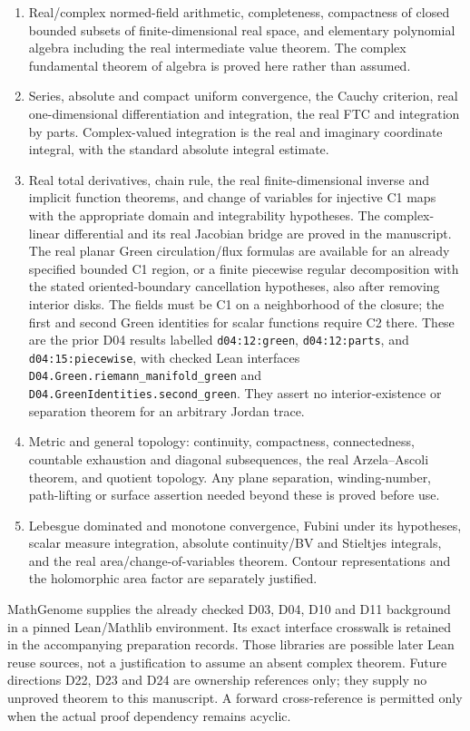 \documentclass[11pt,a4paper,openany]{book}
\theoremstyle{definition}
\theoremstyle{remark}\newtheorem{remark}[theorem]{Remark}
\begin{document}
\begin{enumerate}[label=F\arabic*.]
\item Real/complex normed-field arithmetic, completeness, compactness of closed
bounded subsets of finite-dimensional real space, and elementary polynomial
algebra including the real intermediate value theorem. The complex fundamental
theorem of algebra is proved here rather than assumed.
\item Series, absolute and compact uniform convergence, the Cauchy criterion,
real one-dimensional differentiation and integration, the real FTC and
integration by parts. Complex-valued integration is the real and imaginary
coordinate integral, with the standard absolute integral estimate.
\item Real total derivatives, chain rule, the real finite-dimensional inverse
and implicit function theorems, and change of variables for injective C1 maps
with the appropriate domain and integrability hypotheses. The complex-linear
differential and its real Jacobian bridge are proved in the manuscript.
The real planar Green circulation/flux formulas are available for an already
specified bounded C1 region, or a finite piecewise regular decomposition with
the stated oriented-boundary cancellation hypotheses, also after removing
interior disks. The fields must be C1 on a neighborhood of the closure;
the first and second Green identities for scalar functions require C2 there.
These are the prior D04 results labelled \texttt{d04:12:green},
\texttt{d04:12:parts}, and \texttt{d04:15:piecewise}, with checked Lean interfaces
\texttt{D04.Green.riemann\_manifold\_green} and
\texttt{D04.GreenIdentities.second\_green}. They assert no interior-existence
or separation theorem for an arbitrary Jordan trace.
\item Metric and general topology: continuity, compactness, connectedness,
countable exhaustion and diagonal subsequences, the real Arzela--Ascoli theorem,
and quotient topology. Any plane separation, winding-number, path-lifting or
surface assertion needed beyond these is proved before use.
\item Lebesgue dominated and monotone convergence, Fubini under its hypotheses,
scalar measure integration, absolute continuity/BV and Stieltjes integrals,
and the real area/change-of-variables theorem. Contour representations and
the holomorphic area factor are separately justified.
\end{enumerate}

MathGenome supplies the already checked D03, D04, D10 and D11 background in a
pinned Lean/Mathlib environment. Its exact interface crosswalk is retained in
the accompanying preparation records. Those libraries are possible later Lean
reuse sources, not a justification to assume an absent complex theorem.
Future directions D22, D23 and D24 are ownership references only; they supply
no unproved theorem to this manuscript. A forward cross-reference is permitted
only when the actual proof dependency remains acyclic.
\end{document}
